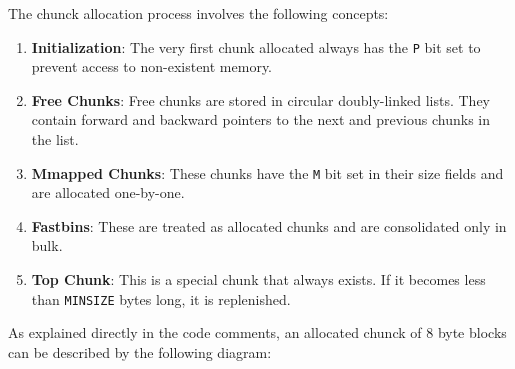     The chunck allocation process involves the following concepts: 

    \begin{enumerate}
        \item \textbf{Initialization}: The very first chunk allocated always has the \texttt{P} bit set to prevent access to non-existent memory.
        
        \item \textbf{Free Chunks}: Free chunks are stored in circular doubly-linked lists. They contain forward and backward pointers to the next and previous chunks in the list.
        
        \item \textbf{Mmapped Chunks}: These chunks have the \texttt{M} bit set in their size fields and are allocated one-by-one.
        
        \item \textbf{Fastbins}: These are treated as allocated chunks and are consolidated only in bulk.
        
        \item \textbf{Top Chunk}: This is a special chunk that always exists. If it becomes less than \texttt{MINSIZE} bytes long, it is replenished.
    \end{enumerate}

    As explained directly in the code comments, an allocated chunck of 8 byte blocks can be described by the following diagram:

